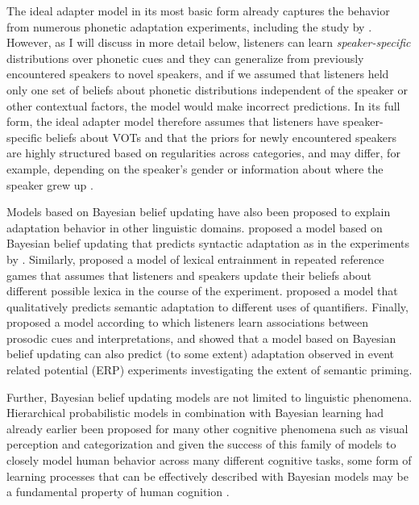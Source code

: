 The ideal adapter model in its most basic form already captures the behavior from numerous phonetic adaptation experiments, including the study by \textcite{Norris2003}. However, as I will discuss in more detail below,
listeners can learn \textit{speaker-specific} distributions over phonetic cues and they can generalize from previously encountered speakers to novel speakers, and if we assumed that listeners held only 
one set of beliefs about phonetic distributions independent of the speaker or other contextual factors, the model would make incorrect predictions. In its full form, the ideal adapter model therefore assumes that 
listeners have speaker-specific beliefs about VOTs and that the priors for newly encountered speakers are highly structured based on regularities across categories, and may differ, for example, depending on the speaker's gender or
information about where the speaker grew up \cite{Kleinschmidt2019}.

Models based on Bayesian belief updating have also been proposed to explain adaptation behavior in other linguistic domains. \textcite{Kleinschmidt2012} proposed a model based on Bayesian belief updating that predicts syntactic adaptation as in the experiments by \textcite{Finel2013}. Similarly, \textcite{Hawkins2017} proposed a model of lexical entrainment in repeated reference games that assumes that listeners and speakers update their beliefs about different possible lexica in the course of the experiment. \textcite{Qing2014} proposed a model that qualitatively predicts semantic adaptation to different uses of quantifiers. Finally, \textcite{Roettger2019} proposed a model according to which listeners learn associations between prosodic cues and interpretations, and \textcite{DelaneyBusch2019} showed that a model based on Bayesian belief updating can also predict (to some extent) adaptation observed in event related potential (ERP) experiments investigating the extent of semantic priming.

Further, Bayesian belief updating models are not limited to linguistic phenomena. Hierarchical probabilistic models in combination with Bayesian learning 
had already earlier been proposed for many other cognitive phenomena such as visual perception  and categorization 
and given the success of this family of models to closely model human behavior across many different cognitive tasks, some form of learning processes that can 
be effectively described with Bayesian models may be a fundamental property of human cognition .

